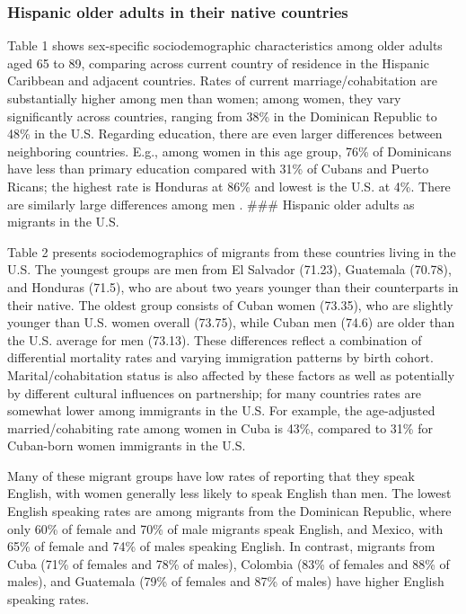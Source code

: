 \documentclass[
]{article}
\begin{document}
\subsubsection{Hispanic older adults in their native
countries}\label{hispanic-older-adults-in-their-native-countries}

Table 1 shows sex-specific sociodemographic characteristics among older
adults aged 65 to 89, comparing across current country of residence in
the Hispanic Caribbean and adjacent countries. Rates of current
marriage/cohabitation are substantially higher among men than women;
among women, they vary significantly across countries, ranging from 38\%
in the Dominican Republic to 48\% in the U.S. Regarding education, there
are even larger differences between neighboring countries. E.g., among
women in this age group, 76\% of Dominicans have less than primary
education compared with 31\% of Cubans and Puerto Ricans; the highest
rate is Honduras at 86\% and lowest is the U.S. at 4\%. There are
similarly large differences among men . \#\#\# Hispanic older adults as
migrants in the U.S.

Table 2 presents sociodemographics of migrants from these countries
living in the U.S. The youngest groups are men from El Salvador (71.23),
Guatemala (70.78), and Honduras (71.5), who are about two years younger
than their counterparts in their native. The oldest group consists of
Cuban women (73.35), who are slightly younger than U.S. women overall
(73.75), while Cuban men (74.6) are older than the U.S. average for men
(73.13). These differences reflect a combination of differential
mortality rates and varying immigration patterns by birth cohort.
Marital/cohabitation status is also affected by these factors as well as
potentially by different cultural influences on partnership; for many
countries rates are somewhat lower among immigrants in the U.S. For
example, the age-adjusted married/cohabiting rate among women in Cuba is
43\%, compared to 31\% for Cuban-born women immigrants in the U.S.

Many of these migrant groups have low rates of reporting that they speak
English, with women generally less likely to speak English than men. The
lowest English speaking rates are among migrants from the Dominican
Republic, where only 60\% of female and 70\% of male migrants speak
English, and Mexico, with 65\% of female and 74\% of males speaking
English. In contrast, migrants from Cuba (71\% of females and 78\% of
males), Colombia (83\% of females and 88\% of males), and Guatemala
(79\% of females and 87\% of males) have higher English speaking rates.
\end{document}
